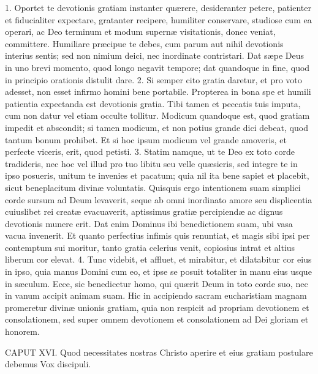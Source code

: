 \documentclass[twoside]{article}
\begin{document}
1. Oportet te devotionis gratiam instanter quærere, desideranter petere, patienter et fiducialiter expectare, gratanter recipere, humiliter conservare, studiose cum ea operari, ac Deo terminum et modum supernæ visitationis, donec veniat, committere. Humiliare præcipue te debes, cum parum aut nihil devotionis interius sentis; sed non nimium deici, nec inordinate contristari. Dat sæpe Deus in uno brevi momento, quod longo negavit tempore; dat quandoque in fine, quod in principio orationis distulit dare.
2. Si semper cito gratia daretur, et pro voto adesset, non esset infirmo homini bene portabile. Propterea in bona spe et humili patientia expectanda est devotionis gratia. Tibi tamen et peccatis tuis imputa, cum non datur vel etiam occulte tollitur. Modicum quandoque est, quod gratiam impedit et abscondit; si tamen modicum, et non potius grande dici debeat, quod tantum bonum prohibet. Et si hoc ipsum modicum vel grande amoveris, et perfecte viceris, erit, quod petisti.
3. Statim namque, ut te Deo ex toto corde tradideris, nec hoc vel illud pro tuo libitu seu velle quæsieris, sed integre te in ipso posueris, unitum te invenies et pacatum; quia nil ita bene sapiet et placebit, sicut beneplacitum divinæ voluntatis. Quisquis ergo intentionem suam simplici corde sursum ad Deum levaverit, seque ab omni inordinato amore seu displicentia cuiuslibet rei creatæ evacuaverit, aptissimus gratiæ percipiendæ ac dignus devotionis munere erit. Dat enim Dominus ibi benedictionem suam, ubi vasa vacua invenerit. Et quanto perfectius infimis quis renuntiat, et magis sibi ipsi per contemptum sui moritur, tanto gratia celerius venit, copiosius intrat et altius liberum cor elevat.
4. Tunc videbit, et affluet, et mirabitur, et dilatabitur cor eius in ipso, quia manus Domini cum eo, et ipse se posuit totaliter in manu eius usque in sæculum. Ecce, sic benedicetur homo, qui quærit Deum in toto corde suo, nec in vanum accipit animam suam. Hic in accipiendo sacram eucharistiam magnam promeretur divinæ unionis gratiam, quia non respicit ad propriam devotionem et consolationem, sed super omnem devotionem et consolationem ad Dei gloriam et honorem.


CAPUT XVI.
Quod necessitates nostras Christo aperire et eius gratiam postulare debemus
Vox discipuli.
\end{document}

